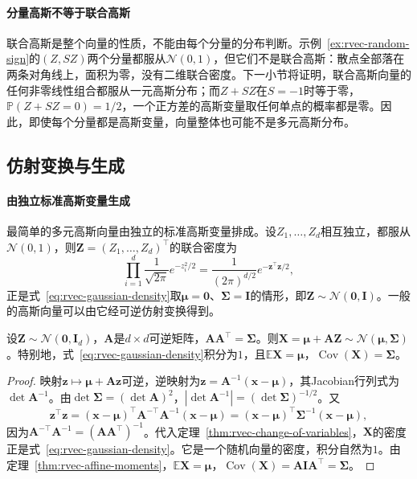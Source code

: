 \paragraph{分量高斯不等于联合高斯}
联合高斯是整个向量的性质，不能由每个分量的分布判断。示例~\ref{ex:rvec-random-sign}的$(Z,SZ)$两个分量都服从$\mathcal N(0,1)$，但它们不是联合高斯：散点全部落在两条对角线上，面积为零，没有二维联合密度。下一小节将证明，联合高斯向量的任何非零线性组合都服从一元高斯分布；而$Z+SZ$在$S=-1$时等于零，$\mathbb P(Z+SZ=0)=1/2$，一个正方差的高斯变量取任何单点的概率都是零。因此，即使每个分量都是高斯变量，向量整体也可能不是多元高斯分布。

\subsection{仿射变换与生成}

\paragraph{由独立标准高斯变量生成}
最简单的多元高斯向量由独立的标准高斯变量排成。设$Z_1,\ldots,Z_d$相互独立，都服从$\mathcal N(0,1)$，则$\bm Z=(Z_1,\ldots,Z_d)^{\top}$的联合密度为
\[
 \prod_{i=1}^d\frac1{\sqrt{2\pi}}e^{-z_i^2/2}=\frac1{(2\pi)^{d/2}}e^{-\bm z^{\top}\bm z/2},
\]
正是式~\eqref{eq:rvec-gaussian-density}取$\bm\mu=\bm0$、$\bm\Sigma=\bm I$的情形，即$\bm Z\sim\mathcal N(\bm0,\bm I)$。一般的高斯向量可以由它经可逆仿射变换得到。

\begin{theorem}[多元高斯向量的生成]
\label{thm:rvec-gaussian-generation}
设$\bm Z\sim\mathcal N(\bm0,\bm I_d)$，$\bm A$是$d\times d$可逆矩阵，$\bm A\bm A^{\top}=\bm\Sigma$。则$\bm X=\bm\mu+\bm A\bm Z\sim\mathcal N(\bm\mu,\bm\Sigma)$。特别地，式~\eqref{eq:rvec-gaussian-density}积分为$1$，且$\mathbb E\bm X=\bm\mu$，$\operatorname{Cov}(\bm X)=\bm\Sigma$。
\end{theorem}

\begin{proof}
映射$\bm z\mapsto\bm\mu+\bm A\bm z$可逆，逆映射为$\bm z=\bm A^{-1}(\bm x-\bm\mu)$，其Jacobian行列式为$\det\bm A^{-1}$。由$\det\bm\Sigma=(\det\bm A)^2$，$|\det\bm A^{-1}|=(\det\bm\Sigma)^{-1/2}$。又
\[
 \bm z^{\top}\bm z=(\bm x-\bm\mu)^{\top}\bm A^{-\top}\bm A^{-1}(\bm x-\bm\mu)=(\bm x-\bm\mu)^{\top}\bm\Sigma^{-1}(\bm x-\bm\mu),
\]
因为$\bm A^{-\top}\bm A^{-1}=(\bm A\bm A^{\top})^{-1}$。代入定理~\ref{thm:rvec-change-of-variables}，$\bm X$的密度正是式~\eqref{eq:rvec-gaussian-density}。它是一个随机向量的密度，积分自然为$1$。由定理~\ref{thm:rvec-affine-moments}，$\mathbb E\bm X=\bm\mu$，$\operatorname{Cov}(\bm X)=\bm A\bm I\bm A^{\top}=\bm\Sigma$。
\end{proof}

